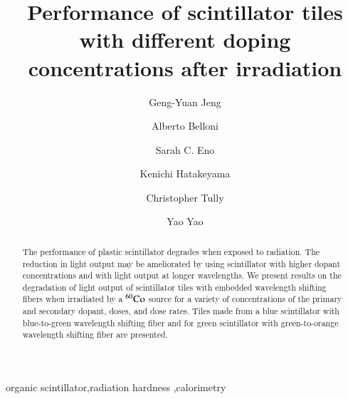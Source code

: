 \documentclass[review]{elsarticle}
\begin{document}
\begin{frontmatter}

\title{Performance of scintillator tiles with different doping concentrations after irradiation }


\author[umd]{Geng-Yuan Jeng}
\author[umd]{Alberto Belloni}
\author[umd]{Sarah C. Eno}
\author[baylor]{Kenichi Hatakeyama}
\author[princeton]{Christopher Tully}
\author[umd]{Yao Yao}


\address[umd]{Dept. Physics, U. Maryland, College Park MD 30742 USA}
\address[eljen]{Eljen Technology, 1300 W. Broadway, Sweetwater, TX 79556 USA}
\address[fnal]{Fermi National Accelerator Laboratory, Batavia, IL, USA}
\address[baylor]{Baylor University, Waco, Texas, USA}
\address[princeton]{Princeton University, Princeton, NJ, USA}

\begin{abstract}
The performance of plastic scintillator degrades when exposed to radiation. 
The reduction in light output may be ameliorated by using scintillator
with higher dopant concentrations and with light output at longer wavelengths.
We present results on the degradation of light output of scintillator
tiles with embedded wavelength shifting  fibers  when irradiated by a $\rm{^{60}Co}$ source for a variety of concentrations of the primary and secondary dopant, doses, and dose rates.  Tiles made from a blue scintillator with blue-to-green wavelength shifting fiber and for green scintillator with green-to-orange wavelength shifting fiber are presented.
\end{abstract}

\begin{keyword}
organic scintillator\sep radiation hardness \sep calorimetry
\end{keyword}

\end{frontmatter}

\linenumbers
\end{document}
